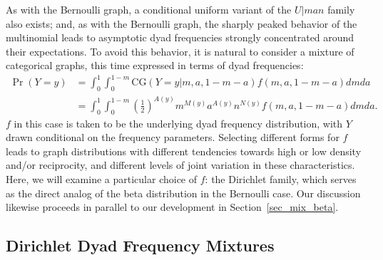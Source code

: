 \documentclass[11pt]{article}
\newcommand{\CG}{\ensuremath{\mathrm{CG}}\xspace}
\begin{document}
As with the Bernoulli graph, a conditional uniform variant of the $U|man$ family also exists; and, as with the Bernoulli graph, the sharply peaked behavior of the multinomial leads to asymptotic dyad frequencies strongly concentrated around their expectations.  To avoid this behavior, it is natural to consider a mixture of categorical graphs, this time expressed in terms of dyad frequencies:
\begin{align}
\Pr(Y=y) &= \int_0^1 \int_0^{1-m} \CG(Y=y|m,a,1-m-a) f(m,a,1-m-a) dm da \nonumber\\
&= \int_0^1 \int_0^{1-m} \left(\frac{1}{2}\right)^{A(y)} m^{M(y)} a^{A(y)} n^{N(y)} f(m,a,1-m-a) dm da. \label{e_dyadmix}
\end{align}
$f$ in this case is taken to be the underlying dyad frequency distribution, with $Y$ drawn conditional on the frequency parameters.  Selecting different forms for $f$ leads to graph distributions with different tendencies towards high or low density and/or reciprocity, and different levels of joint variation in these characteristics.  Here, we will examine a particular choice of $f$: the Dirichlet family, which serves as the direct analog of the beta distribution in the Bernoulli case.  Our discussion likewise proceeds in parallel to our development in Section~\ref{sec_mix_beta}.

\subsection{Dirichlet Dyad Frequency Mixtures}
\end{document}
